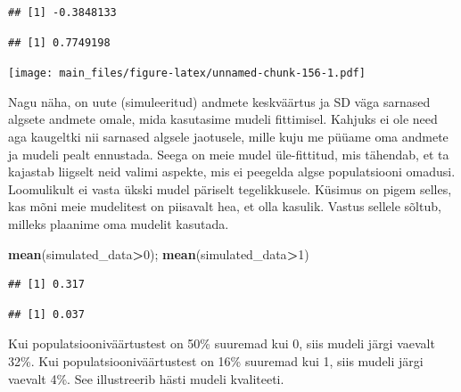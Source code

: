 \documentclass[]{book}
\newenvironment{Shaded}{\begin{snugshade}}{\end{snugshade}}
\newcommand{\KeywordTok}[1]{\textcolor[rgb]{0.13,0.29,0.53}{\textbf{#1}}}
\newcommand{\DecValTok}[1]{\textcolor[rgb]{0.00,0.00,0.81}{#1}}
\newcommand{\StringTok}[1]{\textcolor[rgb]{0.31,0.60,0.02}{#1}}
\newcommand{\OperatorTok}[1]{\textcolor[rgb]{0.81,0.36,0.00}{\textbf{#1}}}
\newcommand{\NormalTok}[1]{#1}
\begin{document}
\begin{verbatim}
## [1] -0.3848133
\end{verbatim}

\begin{verbatim}
## [1] 0.7749198
\end{verbatim}

\texttt{[image: main\_files/figure-latex/unnamed-chunk-156-1.pdf]}

Nagu näha, on uute (simuleeritud) andmete keskväärtus ja SD väga
sarnased algsete andmete omale, mida kasutasime mudeli fittimisel.
Kahjuks ei ole need aga kaugeltki nii sarnased algsele jaotusele, mille
kuju me püüame oma andmete ja mudeli pealt ennustada. Seega on meie
mudel üle-fittitud, mis tähendab, et ta kajastab liigselt neid valimi
aspekte, mis ei peegelda algse populatsiooni omadusi. Loomulikult ei
vasta ükski mudel päriselt tegelikkusele. Küsimus on pigem selles, kas
mõni meie mudelitest on piisavalt hea, et olla kasulik. Vastus sellele
sõltub, milleks plaanime oma mudelit kasutada.

\begin{Shaded}
\begin{Highlighting}[]
\KeywordTok{mean}\NormalTok{(simulated_data}\OperatorTok{>}\DecValTok{0}\NormalTok{); }\KeywordTok{mean}\NormalTok{(simulated_data}\OperatorTok{>}\DecValTok{1}\NormalTok{)}
\end{Highlighting}
\end{Shaded}

\begin{verbatim}
## [1] 0.317
\end{verbatim}

\begin{verbatim}
## [1] 0.037
\end{verbatim}

Kui populatsiooniväärtustest on 50\% suuremad kui 0, siis mudeli järgi
vaevalt 32\%. Kui populatsiooniväärtustest on 16\% suuremad kui 1, siis
mudeli järgi vaevalt 4\%. See illustreerib hästi mudeli kvaliteeti.

\begin{Shaded}
\end{Shaded}
\end{document}
